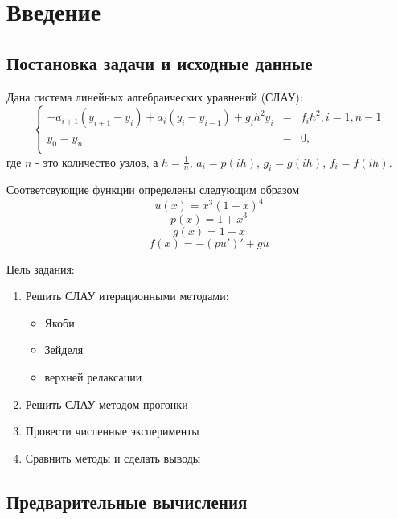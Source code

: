 \chapter{Введение}
\section{Постановка задачи и исходные данные}
Дана система линейных алгебраических уравнений (СЛАУ):
\begin{equation}\label{eq:syst}
	\left\{
	\begin{array}{rcl}
		-a_{i+1}(y_{i+1} - y_i) + a_i(y_i - y_{i-1}) + g_i h^2 y_i&=&f_i h^2, i = 1, n-1\\
		y_0 = y_n&=&0,\\
	\end{array}
	\right.
\end{equation}
где $n$ - это количество узлов, а $h = \frac{1}{n}$, $a_i = p(ih)$, $g_i = g(ih)$, $f_i = f(ih)$.

Соответсвующие функции определены следующим образом
\begin{equation}\label{ux}
	u(x) = x^3(1-x)^4
\end{equation}
\begin{equation}\label{px}
	p(x) = 1+x^3
\end{equation}
\begin{equation}\label{gx}
	g(x) = 1+x
\end{equation}
\begin{equation}\label{fx}
	f(x) = -(pu')'+gu
\end{equation}

Цель задания:
\begin{enumerate}
	\item Решить СЛАУ итерационными методами:
		\begin{itemize}
			\item Якоби
			\item Зейделя
			\item верхней релаксации
		\end{itemize}
	\item Решить СЛАУ методом прогонки
	\item Провести численные эксперименты
	\item Сравнить методы и сделать выводы
\end{enumerate}

\section{Предварительные вычисления}

